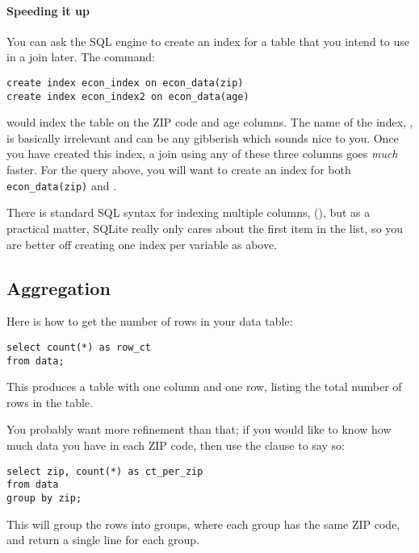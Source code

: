 \paragraph{Speeding it up}
You can ask the SQL engine to create an index for a table that you
intend to use in a join later. The command:
\begin{lstlisting}
create index econ_index on econ_data(zip)
create index econ_index2 on econ_data(age)
\end{lstlisting}
would index the table  on the ZIP code and age columns.
The name of the index, , is basically irrelevant and can
be any gibberish which sounds nice to you. Once you have created this
index, a join using any of these three columns goes {\sl much} faster.
For the query above, you will want to create an index for both {\tt
econ\_data(zip)} and .

There is standard SQL syntax for indexing multiple columns, 
(), but as a
practical matter, SQLite really only cares about the first item in the
list, so you are better off creating one index per variable as above.

\subsection{Aggregation}
Here is how to get the number of rows in your data table:
\begin{lstlisting}
select count(*) as row_ct 
from data;
\end{lstlisting}
This produces a table with one column and one row, listing the total number of rows in the  table.

You probably want more refinement than that; if you would like to
know how much data you have in each ZIP code, then use the  clause to say so:
\begin{lstlisting}
select zip, count(*) as ct_per_zip
from data
group by zip;
\end{lstlisting}
This will group the rows into groups, where each group has the same ZIP
code, and return a single line for each group.

